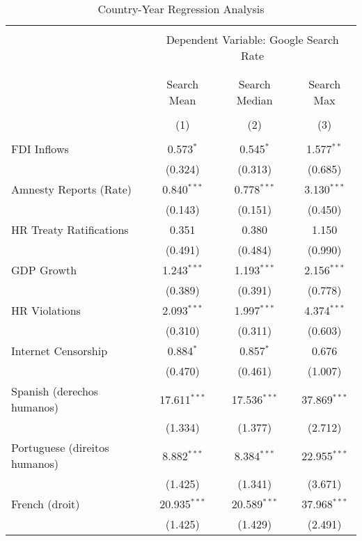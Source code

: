
\begin{table}[!htbp] \centering 
  \caption{Country-Year Regression Analysis} 
  \label{} 
\begin{tabular}{@{\extracolsep{5pt}}lccc} 
\\[-1.8ex]\hline 
\hline \\[-1.8ex] 
 & \multicolumn{3}{c}{Dependent Variable: Google Search Rate} \\ 
\cline{2-4} 
\\[-1.8ex] & \multicolumn{3}{c}{ } \\ 
 & Search Mean & Search Median & Search Max \\ 
\\[-1.8ex] & (1) & (2) & (3)\\ 
\hline \\[-1.8ex] 
 FDI Inflows & 0.573$^{*}$ & 0.545$^{*}$ & 1.577$^{**}$ \\ 
  & (0.324) & (0.313) & (0.685) \\ 
  Amnesty Reports (Rate) & 0.840$^{***}$ & 0.778$^{***}$ & 3.130$^{***}$ \\ 
  & (0.143) & (0.151) & (0.450) \\ 
  HR Treaty Ratifications & 0.351 & 0.380 & 1.150 \\ 
  & (0.491) & (0.484) & (0.990) \\ 
  GDP Growth & 1.243$^{***}$ & 1.193$^{***}$ & 2.156$^{***}$ \\ 
  & (0.389) & (0.391) & (0.778) \\ 
  HR Violations & 2.093$^{***}$ & 1.997$^{***}$ & 4.374$^{***}$ \\ 
  & (0.310) & (0.311) & (0.603) \\ 
  Internet Censorship & 0.884$^{*}$ & 0.857$^{*}$ & 0.676 \\ 
  & (0.470) & (0.461) & (1.007) \\ 
  Spanish (derechos humanos) & 17.611$^{***}$ & 17.536$^{***}$ & 37.869$^{***}$ \\ 
  & (1.334) & (1.377) & (2.712) \\ 
  Portuguese (direitos humanos) & 8.882$^{***}$ & 8.384$^{***}$ & 22.955$^{***}$ \\ 
  & (1.425) & (1.341) & (3.671) \\ 
  French (droit) & 20.935$^{***}$ & 20.589$^{***}$ & 37.968$^{***}$ \\ 
  & (1.425) & (1.429) & (2.491) \\ 

\end{tabular}
\end{table}
